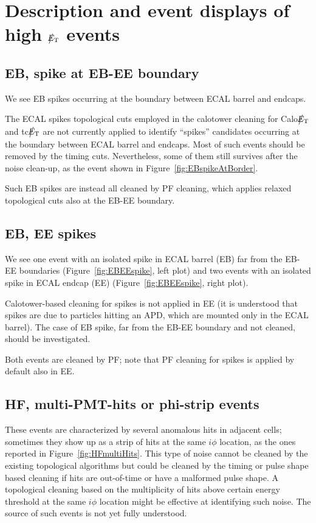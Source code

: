 \section{Description and event displays of high $\big\slash\hspace{-1.6ex}{E_\text{T}}$ events}

\subsection{EB, spike at EB-EE boundary}
We see EB spikes occurring at the boundary between ECAL barrel and endcaps.

The ECAL spikes topological cuts employed in the calotower cleaning for Calo$\big\slash\hspace{-1.6ex}{E_\text{T}}$ and tc$\big\slash\hspace{-1.6ex}{E_\text{T}}$ 
are not currently applied to identify ``spikes'' candidates occurring at the boundary between ECAL barrel and endcaps. 
Most of such events should be removed by the timing cuts. Nevertheless, some of them still survives 
after the noise clean-up, as the event shown in Figure~\ref{fig:EBspikeAtBorder}.

Such EB spikes are instead all cleaned by PF cleaning, which applies relaxed topological cuts also at the EB-EE boundary.

\subsection{EB, EE spikes}
We see one event with an isolated spike in ECAL barrel (EB) far from the EB-EE boundaries 
(Figure~\ref{fig:EBEEspike}, left plot) and two events with an isolated spike in ECAL 
endcap (EE) (Figure~\ref{fig:EBEEspike}, right plot).

Calotower-based cleaning for spikes is not applied in EE (it is understood that 
spikes are due to particles hitting an APD, which are mounted only in the ECAL barrel). 
The case of EB spike, far from the EB-EE boundary and not cleaned, should be investigated.

Both events are cleaned by PF; note that PF cleaning for spikes is applied by default also in EE.

\subsection{HF, multi-PMT-hits or phi-strip events}
These events are characterized by several anomalous hits in adjacent cells; sometimes they show up as
a strip of hits at the same $i\phi$ location, as the ones reported in Figure~\ref{fig:HFmultiHits}. 
This type of noise cannot be cleaned by the existing topological algorithms but could 
be cleaned by the timing or pulse shape based 
cleaning if hits are out-of-time or have a malformed pulse shape. 
A topological cleaning based on the multiplicity of hits above certain energy threshold 
at the same $i\phi$ location might be effective at identifying such noise.
The source of such events is not yet fully understood.

